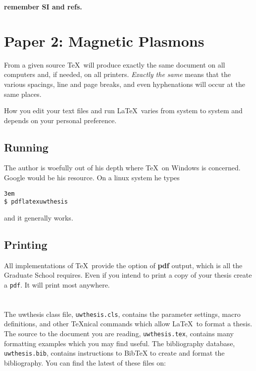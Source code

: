 \documentclass [11pt, proquest] {uwthesis}[2016/11/22]
\newenvironment{demo}
  {\begin{alltt}\leftskip3em
     \def\\{\ttfamily\char`\\}%
     \def\{{\ttfamily\char`\{}%
     \def\}{\ttfamily\char`\}}}
  {\end{alltt}}
\begin{document}
{\bf remember SI and refs.}

 
\chapter{Paper 2: Magnetic Plasmons}
 
 
From a given source \TeX\ will produce exactly the same document
on all computers and, if needed, on all printers.  {\it Exactly the same}
means that the various spacings, line and page breaks, and
even hyphenations will occur at the same places.

How you edit your text files and run \LaTeX\ varies
from system to system and depends on your personal preference.

\section{Running}

The author is woefully out of his depth where 
\TeX\ on Windows is concerned.  Google would be his resource.
On a linux system he types

\begin{demo}
\$\ pdflatex uwthesis
\end{demo}

and it generally works.

 
\section{Printing}
 
All implementations of \TeX\ provide the option of {\bf pdf} output,
which is all the Graduate School requires.  Even if you intend to
print a copy of your thesis create a 
{\tt pdf}.  It will print most anywhere.

\printendnotes

%
%
\nocite{*}   %


%
%
\appendix
\raggedbottom\sloppy
 
 
\chapter{}
 
The uwthesis class file, {\tt uwthesis.cls}, contains the parameter settings,
macro definitions, and other \TeX nical commands which
allow \LaTeX\ to format a thesis.  
The source to
the document you are reading, {\tt uwthesis.tex},
contains many formatting examples
which you may find useful.
The bibliography database, {\tt uwthesis.bib}, contains instructions
to BibTeX to create and format the bibliography.
You can find the latest of these files on:
\end{document}
